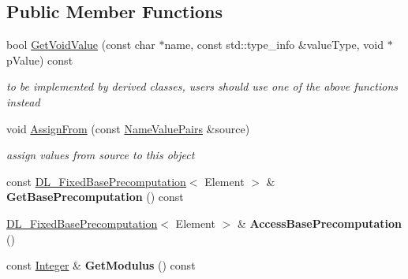 \subsection*{Public Member Functions}
\begin{DoxyCompactItemize}
\item 
\hypertarget{class_d_l___group_parameters___integer_based_impl_aa017775352184937c5f064a4776d587e}{
bool \hyperlink{class_d_l___group_parameters___integer_based_impl_aa017775352184937c5f064a4776d587e}{GetVoidValue} (const char $\ast$name, const std::type\_\-info \&valueType, void $\ast$pValue) const }
\label{class_d_l___group_parameters___integer_based_impl_aa017775352184937c5f064a4776d587e}

\begin{DoxyCompactList}\small\item\em to be implemented by derived classes, users should use one of the above functions instead \item\end{DoxyCompactList}\item 
void \hyperlink{class_d_l___group_parameters___integer_based_impl_a0d668d2148cf57078a93f3a5a4b4ac2a}{AssignFrom} (const \hyperlink{class_name_value_pairs}{NameValuePairs} \&source)
\begin{DoxyCompactList}\small\item\em assign values from source to this object \item\end{DoxyCompactList}\item 
\hypertarget{class_d_l___group_parameters___integer_based_impl_a34500b3da00d75b01f0c1f4c2ad899bf}{
const \hyperlink{class_d_l___fixed_base_precomputation}{DL\_\-FixedBasePrecomputation}$<$ Element $>$ \& {\bfseries GetBasePrecomputation} () const }
\label{class_d_l___group_parameters___integer_based_impl_a34500b3da00d75b01f0c1f4c2ad899bf}

\item 
\hypertarget{class_d_l___group_parameters___integer_based_impl_aa6f498af673543a7569d67e1c874e90c}{
\hyperlink{class_d_l___fixed_base_precomputation}{DL\_\-FixedBasePrecomputation}$<$ Element $>$ \& {\bfseries AccessBasePrecomputation} ()}
\label{class_d_l___group_parameters___integer_based_impl_aa6f498af673543a7569d67e1c874e90c}

\item 
\hypertarget{class_d_l___group_parameters___integer_based_impl_a1ecf6521dbb56060fe6f6d2c6b6493c1}{
const \hyperlink{class_integer}{Integer} \& {\bfseries GetModulus} () const }
\label{class_d_l___group_parameters___integer_based_impl_a1ecf6521dbb56060fe6f6d2c6b6493c1}


\end{DoxyCompactItemize}
